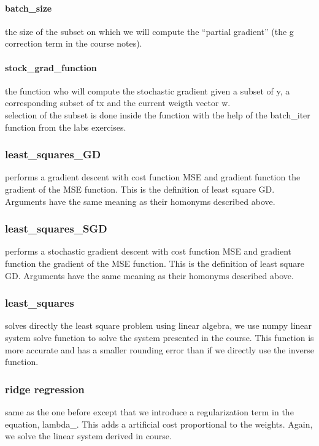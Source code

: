 \documentclass[10pt,conference,compsocconf]{IEEEtran}
\begin{document}
\paragraph{batch\_size} the size of the subset on which we will compute the
``partial gradient'' (the g correction term in the course notes).
\paragraph{stock\_grad\_function} the function who will compute the stochastic
gradient given a subset of y, a corresponding subset of tx and the
current weigth vector w.
\\selection of the subset is done inside the function with
the help of the batch\_iter function from the labs exercises.


\subsubsection{least\_squares\_GD}
performs a gradient descent with cost function MSE and gradient function the gradient of the MSE function. This is the definition of least square GD. Arguments have the same meaning as their homonyms described above.

\subsubsection{least\_squares\_SGD}
performs a stochastic gradient descent with cost function MSE and gradient function the gradient of the MSE function. This is the definition of least square GD. Arguments have the same meaning as their homonyms described above.

\subsubsection{least\_squares}
solves directly the least square problem using linear algebra, we use numpy linear system solve function to solve the system presented in the course. This function is more accurate and has a smaller rounding error than if we directly use the inverse function.

\subsubsection{ridge regression}

same as the one before except that we introduce a regularization term in the equation, lambda\_. This adds a artificial cost proportional to the weights. Again, we solve the linear system derived in course.
\end{document}
